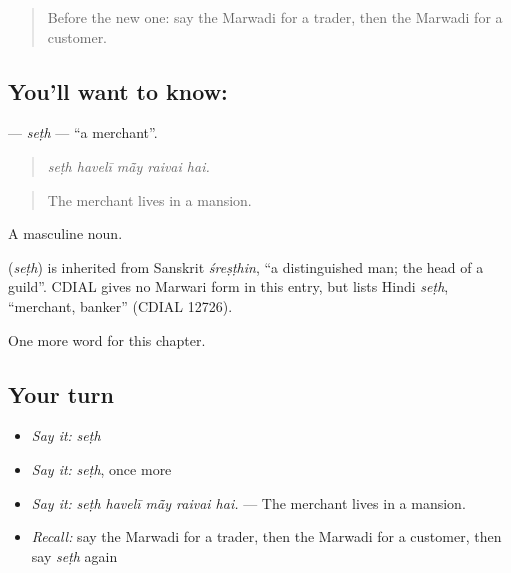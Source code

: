 \begin{quote}
Before the new one: say the Marwadi for a trader, then the Marwadi for a customer.
\end{quote}

\subsection*{You'll want to know: }
\textbf{} — \emph{seṭh} — \textquotedblleft{}a merchant\textquotedblright{}.

\begin{quote}
    
\end{quote}

\begin{quote}
\emph{seṭh havelī mā̃y raivai hai.}
\end{quote}

\begin{quote}
The merchant lives in a mansion.
\end{quote}

A masculine noun.

\begin{cousinweb}
\textbf{} (\emph{seṭh}) is inherited from Sanskrit \emph{śreṣṭhin}, \textquotedblleft{}a distinguished man; the head of a guild\textquotedblright{}. CDIAL gives no Marwari form in this entry, but lists Hindi \emph{seṭh}, \textquotedblleft{}merchant, banker\textquotedblright{} (CDIAL 12726).
\end{cousinweb}

\begin{grammarlens}[title={What you've built}]
One more word for this chapter.
\end{grammarlens}

\subsection*{Your turn}
\begin{itemize}
\raggedright
  \item \emph{Say it:} \emph{seṭh}
  \item \emph{Say it:} \emph{seṭh}, once more
  \item \emph{Say it:} \emph{seṭh havelī mā̃y raivai hai.} — The merchant lives in a mansion.
  \item \emph{Recall:} say the Marwadi for a trader, then the Marwadi for a customer, then say \emph{seṭh} again
\end{itemize}

